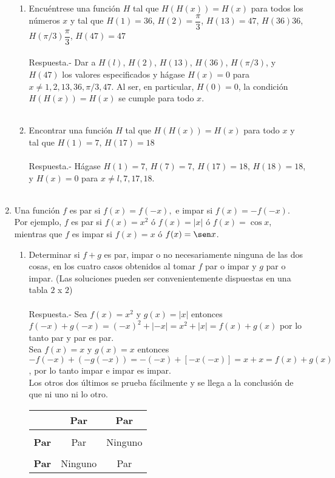 \begin{enumerate}
\begin{enumerate}[\bfseries (a)]
	    \item Encuéntrese una función $H$ tal que $H(H(x))=H(x)$ para todos los números $x$ y tal que $H(1)=36$, $H(2)=\dfrac{\pi}{3}$, $H(13)=47$, $H(36)36$, $H(\pi / 3)\dfrac{\pi}{3}$, $H(47)=47$\\\\
	    Respuesta.-\; Dar a $H(l)$, $H(2)$, $H(13)$, $H(36)$, $H(\pi /3)$, y $H(47)$ los valores especificados y hágase $H(x) = 0$ para $x \neq 1, 2, 13, 36, \pi /3, 47.$ Al ser, en particular, $H(0) = 0$, la condición $H(H(x)) = H(x)$ se cumple para todo $x$.\\\\

	    \item Encontrar una función $H$ tal que $H(H(x))=H(x)$ para todo $x$ y tal que $H(1)=7$, $H(17)=18$\\\\
	    Respuesta.-\; Hágase $H(1) = 7$, $H(7) = 7$, $H(17) = 18$, $H(18) = 18$, y $H(x) = 0$ para $x \neq l , 7, 17, 18$.\\\\

	\end{enumerate}

	\item Una función $f$ es par si $f(x)=f(-x),$ e impar si $f(x)=-f(-x)$. Por ejemplo, $f$ es par si $f(x)=x^2$ ó $f(x)=|x|$ ó $f(x)=\cos x$, mientras que $f$ es impar si $f(x)=x$ ó $f(x)=\sen x$.

	\begin{enumerate}[\bfseries (a)]

	    \item Determinar si $f+g$ es par, impar o no necesariamente ninguna de las dos cosas, en los cuatro casos obtenidos al tomar $f$ par o impar y $g$ par o impar. (Las soluciones pueden ser convenientemente dispuestas en una tabla $2$ x $2$)\\\\
	    Respuesta.-\; Sea $f(x)=x^2$ y $g(x)=|x|$ entonces $f(-x)+g(-x)=(-x)^2 + |-x| = x^2 + |x| = f(x) + g(x)$ por lo tanto par y par es par.\\
	    Sea $f(x) = x$ y $g(x)=x$ entonces $-f(-x) + (-g(-x)) = -(-x) + [-x(-x)] = x + x = f(x) + g(x)$, por lo tanto impar e impar es impar.\\
	    Los otros dos últimos se prueba fácilmente y se llega a la conclusión de que ni uno ni lo otro.
	    \begin{center}
		\begin{tabular}{c|cc}
		    &\textbf{Par}&\textbf{Par}\\
		    \hline\\
		    \textbf{Par}&Par&Ninguno\\\\
		    \textbf{Par}&Ninguno&Par\\
		\end{tabular}
	    \end{center}
	    \vspace{1cm}


\end{enumerate}
\end{enumerate}
